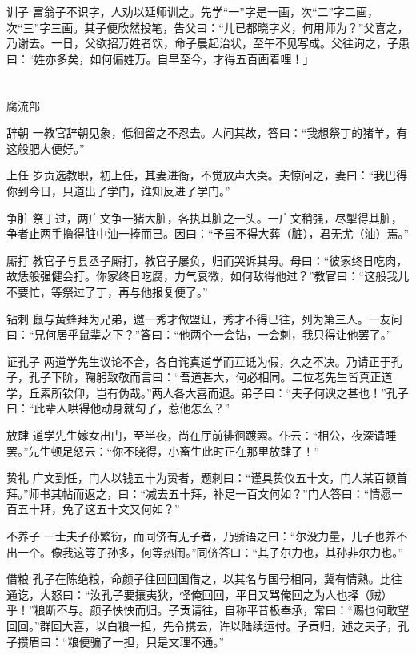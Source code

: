 \documentclass[12pt,UTF8]{ctexbook}
\begin{document}
训子
富翁子不识字，人劝以延师训之。先学“一”字是一画，次“二”字二画，次“三”字三画。其子便欣然投笔，告父曰：“儿已都晓字义，何用师为？”父喜之，乃谢去。一日，父欲招万姓者饮，命子晨起治状，至午不见写成。父往询之，子患曰：“姓亦多矣，如何偏姓万。自早至今，才得五百画着哩！」

\part{}

腐流部

辞朝
一教官辞朝见象，低徊留之不忍去。人问其故，答曰：“我想祭丁的猪羊，有这般肥大便好。”

上任
岁贡选教职，初上任，其妻进衙，不觉放声大哭。夫惊问之，妻曰：“我巴得你到今日，只道出了学门，谁知反进了学门。”

争脏
祭丁过，两广文争一猪大脏，各执其脏之一头。一广文稍强，尽掣得其脏，争者止两手撸得脏中油一捧而已。因曰：“予虽不得大葬（脏），君无尤（油）焉。”

厮打
教官子与县丞子厮打，教官子屡负，归而哭诉其母。母曰：“彼家终日吃肉，故恁般强健会打。你家终日吃腐，力气衰微，如何敌得他过？”教官曰：“这般我儿不要忙，等祭过了丁，再与他报复便了。”

钻刺
鼠与黄蜂拜为兄弟，邀一秀才做盟证，秀才不得已往，列为第三人。一友问曰：“兄何居乎鼠辈之下？”答曰：“他两个一会钻，一会刺，我只得让他罢了。”

证孔子
两道学先生议论不合，各自诧真道学而互诋为假，久之不决。乃请正于孔子，孔子下阶，鞠躬致敬而言曰：“吾道甚大，何必相同。二位老先生皆真正道学，丘素所钦仰，岂有伪哉。”两人各大喜而退。弟子曰：“夫子何谀之甚也！”孔子曰：“此辈人哄得他动身就勾了，惹他怎么？”

放肆
道学先生嫁女出门，至半夜，尚在厅前徘徊踱索。仆云：“相公，夜深请睡罢。”先生顿足怒云：“你不晓得，小畜生此时正在那里放肆了！”

贽礼
广文到任，门人以钱五十为贽者，题刺曰：“谨具贽仪五十文，门人某百顿首拜。”师书其帖而返之，曰：“减去五十拜，补足一百文何如？”门人答曰：“情愿一百五十拜，免了这五十文又何如？”

不养子
一士夫子孙繁衍，而同侪有无子者，乃骄语之曰：“尔没力量，儿子也养不出一个。像我这等子孙多，何等热闹。”同侪答曰：“其子尔力也，其孙非尔力也。”

借粮
孔子在陈绝粮，命颜子往回回国借之，以其名与国号相同，冀有情熟。比往通讫，大怒曰：“汝孔子要攘夷狄，怪俺回回，平日又骂俺回之为人也择（贼）乎！”粮断不与。颜子怏怏而归。子贡请往，自称平昔极奉承，常曰：“赐也何敢望回回。”群回大喜，以白粮一担，先令携去，许以陆续运付。子贡归，述之夫子，孔子攒眉曰：“粮便骗了一担，只是文理不通。”
\end{document}
